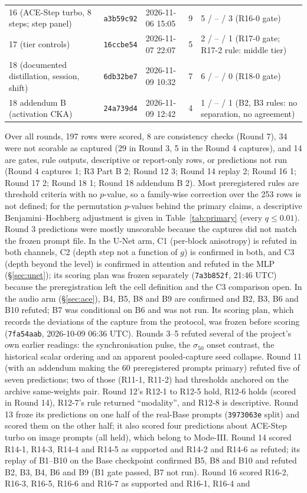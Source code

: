 \documentclass[11pt]{article}
\begin{document}
\begin{table}[htbp]
\begin{tabularx}{\linewidth}{@{}lllcL@{}}
16 (ACE-Step turbo, 8 steps; step panel) & \texttt{a3b59c92} & 2026-11-06 15:05 & 9 & 5 / -- / 3 (R16-0 gate)\\
17 (tier controls) & \texttt{16ccbe54} & 2026-11-07 22:07 & 5 & 2 / -- / 1 (R17-0 gate; R17-2 rule: middle tier)\\
18 (documented distillation, session, shift) & \texttt{6db32be7} & 2026-11-09 10:32 & 7 & 6 / -- / 0 (R18-0 gate)\\
18 addendum B (activation CKA) & \texttt{24a739d4} & 2026-11-09 12:42 & 4 & 1 / -- / 1 (B2, B3 rules: no separation, no agreement)\\
\bottomrule
\end{tabularx}
\end{table}
Over all rounds, 197 rows were scored, 8 are consistency checks (Round 7), 34 were not scorable as captured (29 in Round 3, 5 in the Round 4 captures), and 14 are gates, rule outputs, descriptive or report-only rows, or predictions not run (Round 4 captures 1; R3 Part B 2; Round 12 3; Round 14 replay 2; Round 16 1; Round 17 2; Round 18 1; Round 18 addendum B 2). Most preregistered rules are threshold criteria with no $p$-value, so a family-wise correction over the 253 rows is not defined; for the permutation $p$-values behind the primary claims, a descriptive Benjamini--Hochberg adjustment is given in Table~\ref{tab:primary} (every $q\le0.01$). Round 3 predictions were mostly unscorable because the captures did not match the frozen prompt file. In the U-Net arm, C1 (per-block anisotropy) is refuted in both channels, C2 (depth step not a function of $g$) is confirmed in both, and C3 (depth beyond the level) is confirmed in attention and refuted in the MLP (\S\ref{sec:unet}); its scoring plan was frozen separately (\texttt{7a3b852f}, 21:46 UTC) because the preregistration left the cell definition and the C3 comparison open. In the audio arm (\S\ref{sec:ace}), B4, B5, B8 and B9 are confirmed and B2, B3, B6 and B10 refuted; B7 was conditional on B6 and was not run. Its scoring plan, which records the deviations of the capture from the protocol, was frozen before scoring (\texttt{7fa54aab}, 2026-10-09 06:36 UTC). Rounds 3--5 refuted several of the project's own earlier readings: the synchronisation pulse, the $\sigma_{50}$ onset contrast, the historical scalar ordering and an apparent pooled-capture seed collapse. Round 11 (with an addendum making the 60 preregistered prompts primary) refuted five of seven predictions; two of those (R11-1, R11-2) had thresholds anchored on the archive same-weights pair. Round 12's R12-1 to R12-5 hold, R12-6 holds (scored in Round 14), R12-7's rule returned ``modality'', and R12-8 is descriptive. Round 13 froze its predictions on one half of the real-Base prompts (\texttt{3973063e} split) and scored them on the other half; it also scored four predictions about ACE-Step turbo on image prompts (all held), which belong to Mode-III. Round 14 scored R14-1, R14-3, R14-4 and R14-5 as supported and R14-2 and R14-6 as refuted; its replay of B1--B10 on the Base checkpoint confirmed B5, B8 and B10 and refuted B2, B3, B4, B6 and B9 (B1 gate passed, B7 not run). Round 16 scored R16-2, R16-3, R16-5, R16-6 and R16-7 as supported and R16-1, R16-4 and 
\end{document}

